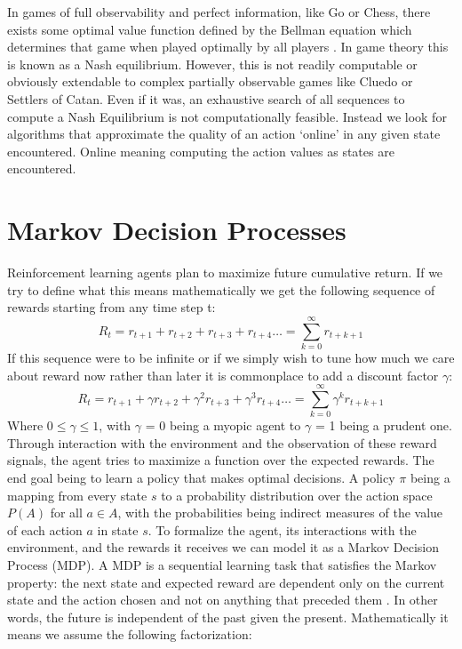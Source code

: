 \documentclass[msc, deptreport, ai, romanprepages]{infthesis}
\begin{document}
In games of full observability and perfect information, like Go or Chess, there exists some optimal value function defined by the Bellman equation which determines that game when played optimally by all players \cite{Silver2016}. In game theory this is known as a Nash equilibrium. However, this is not readily computable or obviously extendable to complex partially observable games like Cluedo or Settlers of Catan. Even if it was, an exhaustive search of all sequences to compute a Nash Equilibrium is not computationally feasible. Instead we look for algorithms that approximate the quality of an action `online' in any given state encountered. Online meaning computing the action values as states are encountered. 

\section{Markov Decision Processes}
Reinforcement learning agents plan to maximize future cumulative return. If we try to define what this means mathematically we get the following sequence of rewards starting from any time step t:
\begin{equation}
R_t = r_{t+1} + r_{t+2} + r_{t+3} + r_{t+4}\ldots = \sum_{k=0}^\infty r_{t+k+1}
\end{equation}
If this sequence were to be infinite or if we simply wish to tune how much we care about reward now rather than later it is commonplace to add a discount factor \(\gamma\):
\begin{equation}
R_t = r_{t+1} + \gamma r_{t+2} + \gamma^2 r_{t+3} + \gamma^3 r_{t+4}\ldots = \sum_{k=0}^\infty \gamma^k r_{t+k+1}
\end{equation}
Where \(0 \leq \gamma \leq 1\), with \(\gamma\) = 0 being a myopic agent to \(\gamma\) = 1 being a prudent one. Through interaction with the environment and the observation of these reward signals, the agent tries to maximize a function over the expected rewards. The end goal being to learn a policy that makes optimal decisions. A policy \(\pi\) being a mapping from every state \(s\) to a probability distribution over the action space \(P(A)\) for all \(a\in A\), with the probabilities being indirect measures of the value of each action \(a\) in state \(s\). 
To formalize the agent, its interactions with the environment, and the rewards it receives we can model it as a Markov Decision Process (MDP). A MDP is a sequential learning task that satisfies the Markov property: the next state and expected reward are dependent only on the current state and the action chosen and not on anything that preceded them \cite{Russell-norvig}. In other words, the future is independent of the past given the present. Mathematically it means we assume the following factorization:
\end{document}
